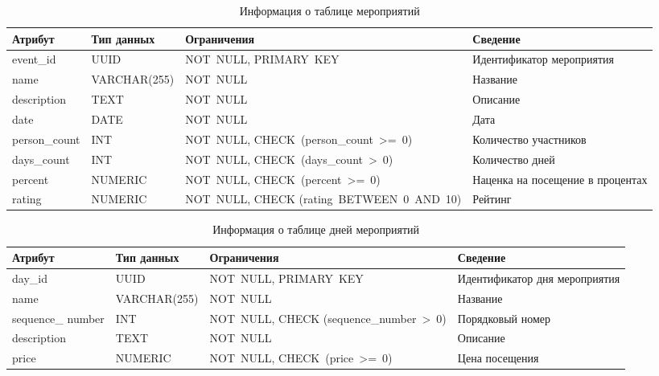 \begin{table}[h!]
	\centering
	\caption{Информация о таблице мероприятий}
	\begin{tabularx}{\textwidth}{|p{2.6cm}|X|p{6cm}|X|}
		\hline
		\textbf{Атрибут} & \textbf{Тип данных} & \textbf{Ограничения} & \textbf{Сведение} \\
		\hline
		event\_id & UUID & NOT~NULL, \newline PRIMARY~KEY & Идентификатор мероприятия \\
		\hline
		name & VARCHAR(255) & NOT~NULL & Название \\
		\hline
		description & TEXT & NOT~NULL & Описание \\
		\hline
		date & DATE & NOT~NULL & Дата \\
		\hline
		person\_count & INT & NOT~NULL, \newline CHECK~(person\_count~>=~0) & Количество участников \\
		\hline
		days\_count & INT & NOT~NULL, \newline CHECK~(days\_count~>~0) & Количество дней \\
		\hline
		percent & NUMERIC & NOT~NULL, \newline CHECK~(percent~>=~0) & Наценка на посещение в процентах \\
		\hline
		rating & NUMERIC & NOT~NULL, \newline CHECK (rating~BETWEEN~0~AND~10) & Рейтинг \\
		\hline
	\end{tabularx}
	\label{tbl:events}
\end{table}

\begin{table}[h!]
	\centering
	\caption{Информация о таблице дней мероприятий}
	\begin{tabularx}{\textwidth}{|p{2.6cm}|X|p{6cm}|X|}
		\hline
		\textbf{Атрибут} & \textbf{Тип данных} & \textbf{Ограничения} & \textbf{Сведение} \\
		\hline
		day\_id & UUID & NOT~NULL, \newline PRIMARY~KEY & Идентификатор дня мероприятия \\
		\hline
		name & VARCHAR(255) & NOT~NULL & Название \\
		\hline
		sequence\_ number & INT & NOT~NULL, \newline CHECK (sequence\_number~>~0) & Порядковый номер \\
		\hline
		description & TEXT & NOT~NULL & Описание \\
		\hline
		price & NUMERIC & NOT~NULL, \newline CHECK~(price~>=~0) & Цена посещения \\
		\hline
	\end{tabularx}
	\label{tbl:days}
\end{table}

